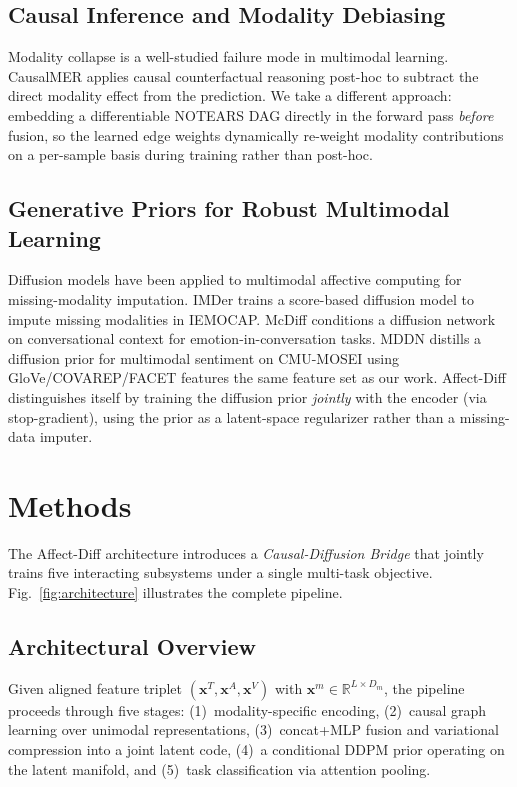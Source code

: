 \documentclass[conference]{IEEEtran}
\begin{document}
\subsection{Causal Inference and Modality Debiasing}
Modality collapse is a well-studied failure mode in multimodal learning.
CausalMER \cite{causalmer2024} applies causal counterfactual reasoning
post-hoc to subtract the direct modality effect from the prediction.
We take a different approach: embedding a differentiable NOTEARS DAG
\cite{zheng2018notears} directly in the forward pass \emph{before} fusion,
so the learned edge weights dynamically re-weight modality contributions
on a per-sample basis during training rather than post-hoc.

\subsection{Generative Priors for Robust Multimodal Learning}
Diffusion models have been applied to multimodal affective computing for
missing-modality imputation.  IMDer \cite{imder2024} trains a score-based
diffusion model to impute missing modalities in IEMOCAP.  McDiff
\cite{mcdiff2025} conditions a diffusion network on conversational context
for emotion-in-conversation tasks.  MDDN \cite{mddn2025} distills a
diffusion prior for multimodal sentiment on CMU-MOSEI using GloVe/COVAREP/FACET
features the same feature set as our work.  Affect-Diff distinguishes
itself by training the diffusion prior \emph{jointly} with the encoder
(via stop-gradient), using the prior as a latent-space regularizer rather
than a missing-data imputer.

\section{Methods}
\label{sec:methods}

The Affect-Diff architecture introduces a \emph{Causal-Diffusion Bridge} that
jointly trains five interacting subsystems under a single multi-task objective.
Fig.~\ref{fig:architecture} illustrates the complete pipeline.

\subsection{Architectural Overview}

Given aligned feature triplet $(\mathbf{x}^T, \mathbf{x}^A, \mathbf{x}^V)$
with $\mathbf{x}^m \in \mathbb{R}^{L \times D_m}$, the pipeline proceeds
through five stages: (1)~modality-specific encoding, (2)~causal graph learning
over unimodal representations, (3)~concat+MLP fusion and variational compression
into a joint latent code, (4)~a conditional DDPM prior operating on the latent
manifold, and (5)~task classification via attention pooling.
\end{document}
